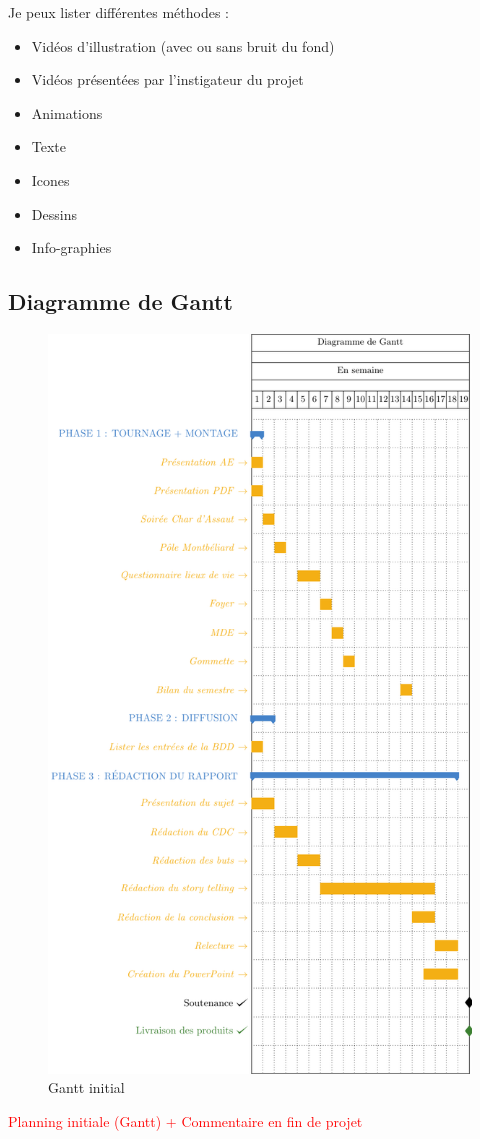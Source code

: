 Je peux lister différentes méthodes :
\begin{itemize}
    \item Vidéos d'illustration (avec ou sans bruit du fond)
    \item Vidéos présentées par l'instigateur du projet
    \item Animations
    \item Texte
    \item Icones
    \item Dessins
    \item Info-graphies
\end{itemize}

\subsection{Diagramme de Gantt}\label{subsec:diagramme-de-gantt}


\begin{figure}[!h]
    \begin{center}
        \includegraphics[scale=0.6]{ressources/gantt}
        \caption{Gantt initial \label{fig:ganttIni}}
    \end{center}
\end{figure}


\textcolor{red}{Planning initiale  (Gantt) + Commentaire en fin de projet}




